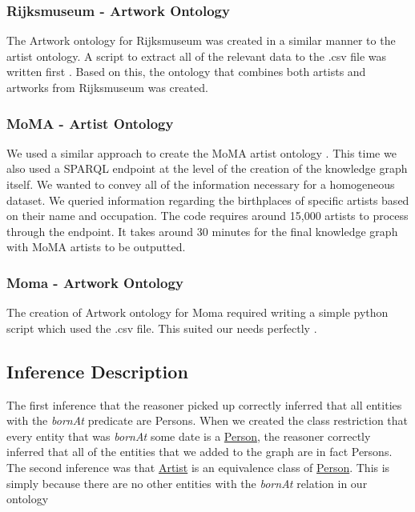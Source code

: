 \documentclass{article}
\begin{document}
\subsubsection{Rijksmuseum - Artwork Ontology}
The Artwork ontology for Rijksmuseum was created in a similar manner to the artist ontology. A script to
extract all of the relevant data to the .csv file was written first \cite{Fourth_Github}. Based
on this, the ontology that combines both artists and artworks from Rijksmuseum was created\cite{lolGith2}. 

\subsubsection{MoMA - Artist Ontology}
We used a similar approach to create the MoMA artist ontology \cite{Fith_Github}. This time we also used a
SPARQL endpoint at the level of the creation of the knowledge graph itself. We wanted to
convey all of the information necessary for a homogeneous dataset. We queried information
regarding the birthplaces of specific artists based on their name and occupation. The code
requires around 15,000 artists to process through the endpoint. It takes around 30 minutes for
the final knowledge graph with MoMA artists to be outputted.

\subsubsection{Moma - Artwork Ontology}

The creation of Artwork ontology for Moma required writing a simple python script which used the .csv file. This suited our needs perfectly \cite{Sixth_Github}. 

\newpage
\subsection{Inference Description}

The first inference that the reasoner picked up correctly inferred that all entities with the \textit{bornAt}
predicate are Persons. When we created the class restriction that every entity that was \textit{bornAt}
some date is a \underline{Person}, the reasoner correctly inferred that all of the entities that we added to the
graph are in fact Persons. The second inference was that \underline{Artist} is an equivalence class of \underline{Person}. This is simply because
there are no other entities with the \textit{bornAt} relation in our ontology 
\end{document}
